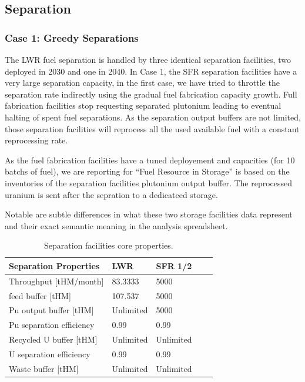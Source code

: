 \documentclass[12pt]{article}
\begin{document}
\subsection{Separation}

\subsubsection{Case 1: Greedy Separations}

The LWR fuel separation is handled by three identical separation facilities,
two deployed in 2030 and one in 2040. In Case 1, the SFR separation facilities have a
very large separation capacity, in the first case, we have tried to throttle
the separation rate indirectly using the gradual fuel fabrication capacity
growth. Full fabrication facilities stop requesting separated plutonium
leading to eventual halting of spent fuel separations.
As the separation output buffers are not limited, those separation facilities will
reprocess all the used available fuel with a constant reprocessing rate.

As the fuel fabrication facilities have a tuned deployement and capacities (for 10
batchs of fuel), we are reporting for ``Fuel Resource in Storage'' is based on the
inventories of the separation facilities plutonium output buffer.
The reprocessed uranium is sent after the sepration to a dedicateed storage.

Notable are subtle differences in what these two storage facilities data represent
and their exact semantic meaning in the analysis spreadsheet.

\begin{table}[h!]
    \centering
    \begin{tabular}{lllll}
    \hline
    Separation Properties     &  LWR        &  SFR 1/2    \\
    \hline
    Throughput [tHM/month]    &  83.3333    &  5000       \\
    feed buffer [tHM]         &  107.537    &  5000       \\
    Pu output buffer [tHM]    &  Unlimited  &  5000       \\
    Pu separation efficiency  &  0.99       &  0.99       \\
    Recycled U buffer [tHM]   &  Unlimited  &  Unlimited  \\
    U separation efficiency   &  0.99       &  0.99       \\
    Waste buffer [tHM]        &  Unlimited  &  Unlimited  \\
    \hline
    \end{tabular}
    \caption{Separation facilities core properties. }
    \label{tab:separation_1}
\end{table}
\end{document}
